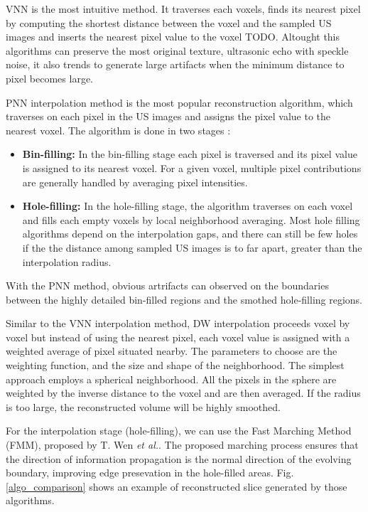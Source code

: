 \documentclass[12pt,journal,compsoc]{IEEEtran}
\begin{document}
VNN is the most intuitive method. It traverses each voxels, finds its nearest pixel by computing the shortest distance between the voxel and the sampled US images and inserts the nearest pixel value to the voxel TODO.
Altought this algorithms can preserve the most original texture, ultrasonic echo with speckle noise, it also trends to generate large artifacts when the minimum distance to pixel becomes large.\par

PNN interpolation method is the most popular reconstruction algorithm, which traverses on each pixel in the US images and assigns the pixel value to the nearest voxel.
The algorithm is done in two stages :
\begin{itemize}
	\item \textbf{Bin-filling:} In the bin-filling stage each pixel is traversed and its pixel value is assigned to its nearest voxel. For a given voxel, multiple pixel contributions are generally handled by averaging pixel intensities.  
	\item \textbf{Hole-filling:} In the hole-filling stage, the algorithm traverses on each voxel and fills each empty voxels by local neighborhood averaging. Most hole filling algorithms depend on the interpolation gaps, and there can still be few holes if the the distance among sampled US images is to far apart, greater than the interpolation radius. 
\end{itemize}
With the PNN method, obvious artrifacts can observed on the boundaries between the highly detailed bin-filled regions and the smothed hole-filling regions.\par

Similar to the VNN interpolation method, DW interpolation proceeds voxel by voxel but instead of using the nearest pixel, each voxel value is assigned with a weighted average of pixel situated nearby. The parameters to choose are the weighting function, and the size and shape of the neighborhood. The simplest approach employs a spherical neighborhood. All the pixels in the sphere are weighted by the inverse distance to the voxel and are then averaged. If the radius is too large, the reconstructed volume will be highly smoothed.

For the interpolation stage (hole-filling), we can use the Fast Marching Method (FMM), proposed by T. Wen \textit{et al.}\cite{2}. The proposed marching process ensures that the direction of information propagation is the normal direction of the evolving boundary, improving edge presevation in the hole-filled areas.
Fig.\ref{algo_comparison} shows an example of reconstructed slice generated by those algorithms.
\end{document}
